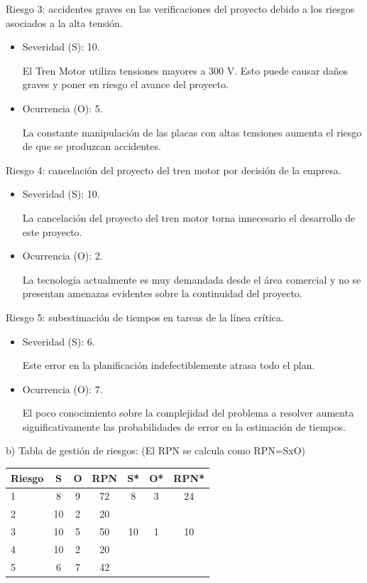 \documentclass[
11pt, %
codirector, %
]{charter}
\begin{document}
Riesgo 3: accidentes graves en las verificaciones del proyecto debido a los riesgos asociados a la alta tensión.
\begin{itemize}
	\item Severidad (S): 10.

	      El Tren Motor utiliza tensiones mayores a 300 V. Esto puede causar daños graves y poner en riesgo el avance del proyecto.
	\item Ocurrencia (O): 5.

	      La constante manipulación de las placas con altas tensiones aumenta el riesgo de que se produzcan accidentes.
\end{itemize}

Riesgo 4: cancelación del proyecto del tren motor por decisión de la empresa.
\begin{itemize}
	\item Severidad (S): 10.

	      La cancelación del proyecto del tren motor torna innecesario el desarrollo de este proyecto.
	\item Ocurrencia (O): 2.

	      La tecnología actualmente es muy demandada desde el área comercial y no se presentan amenazas evidentes sobre la continuidad del proyecto.
\end{itemize}

Riesgo 5: subestimación de tiempos en tareas de la línea crítica.
\begin{itemize}
	\item Severidad (S): 6.

	      Este error en la planificación indefectiblemente atrasa todo el plan.

	\item Ocurrencia (O): 7.

	      El poco conocimiento sobre la complejidad del problema a resolver aumenta significativamente las probabilidades de error en la estimación de tiempos.
\end{itemize}
b) Tabla de gestión de riesgos:      (El RPN se calcula como RPN=SxO)
\begin{table}[htpb]
	\centering
	\begin{tabularx}{\linewidth}{@{}|X|c|c|c|c|c|c|@{}}
		\hline
		\rowcolor[HTML]{C0C0C0}
		Riesgo & S  & O & RPN & S* & O* & RPN* \\ \hline
		1      & 8  & 9 & 72  & 8  & 3  & 24   \\ \hline
		2      & 10 & 2 & 20  &    &    &      \\ \hline
		3      & 10 & 5 & 50  & 10 & 1  & 10   \\ \hline
		4      & 10 & 2 & 20  &    &    &      \\ \hline
		5      & 6  & 7 & 42  &    &    &      \\ \hline
	\end{tabularx}%
\end{table}
\end{document}
